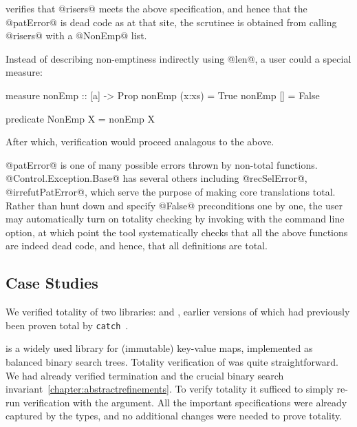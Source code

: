 \toolname verifies that @risers@ meets the above specification, 
and hence that the @patError@ is dead code as at that 
site, the scrutinee is obtained from calling @risers@ with a
@NonEmp@ list.

Instead of describing non-emptiness indirectly using @len@, a 
user could a special measure:
%
\begin{code}
  measure nonEmp  :: [a] -> Prop
  nonEmp (x:xs)   = True
  nonEmp []       = False

  predicate NonEmp X = nonEmp X
\end{code}
%
After which, verification would proceed analagous to the above.

@patError@ is one of many possible errors thrown by non-total functions.  
@Control.Exception.Base@ has several others including @recSelError@, @irrefutPatError@, \etc which serve the purpose of making 
core translations total.
%
Rather than hunt down and specify @False@ preconditions one
by one, the user may automatically turn on totality checking 
by invoking \toolname with the \cmdtotality command line option, 
at which point the tool systematically checks that all the above 
functions are indeed dead code, and hence, that all definitions are total.

\subsection{Case Studies}

We verified totality of two libraries: \lbhscolour and \lbmap, earlier versions
of which had previously been proven total by \texttt{catch}~\citep{catch}.

\mypara{\lbmap} 
is a widely used library for (immutable) key-value maps, implemented
as balanced binary search trees.
Totality verification of \lbmap was quite straightforward.
We had already verified termination and the crucial 
binary search invariant~\ref{chapter:abstractrefinements}. To verify 
totality it sufficed to simply re-run verification with
the \cmdtotality argument.
%
All the important specifications were already captured by the types, 
and no additional changes were needed to prove totality.
%
%

